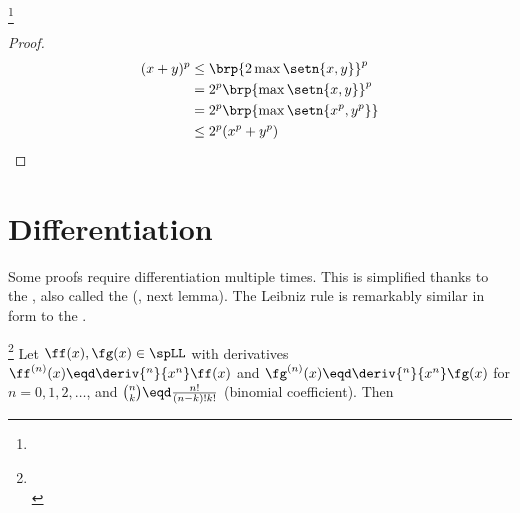 \begin{proposition}
\footnote{
  }
\end{proposition}
\begin{proof}
\begin{align*}
  (x+y)^p
    &\le \brp{2\max\setn{x,y}}^p 
  \\&=   2^p \brp{\max\setn{x,y}}^p 
  \\&=   2^p \brp{\max\setn{x^p,y^p}} 
  \\&\le 2^p(x^p + y^p)
\end{align*}
\end{proof}


\section{Differentiation}
Some proofs require differentiation multiple times.
This is simplified thanks to the , also called the 
 (, next lemma).
The Leibniz rule is remarkably similar in form to the .
\begin{lemma}[Leibniz rule]
\label{lem:LGPR}
\footnote{
  \\
  }
Let $\ff(x),\fg(x)\in\spLL$ with derivatives
$\ff^{(n)}(x)\eqd\deriv{^n}{x^n}\ff(x)$ and
$\fg^{(n)}(x)\eqd\deriv{^n}{x^n}\fg(x)$ for $n=0,1,2,\ldots$,
and ${n\choose k}\eqd\frac{n!}{(n-k)!k!}$ (binomial coefficient).
Then
\end{lemma}


